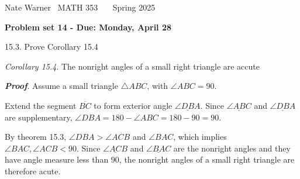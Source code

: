 \documentclass{report}
\title{\Huge{}}
\author{\huge{Nathan Warner}}
\date{\huge{}}
\begin{document}
    \pagebreak \bigbreak \noindent
    Nate Warner \ \quad \quad \quad \quad \quad \quad \quad \quad \quad \quad \quad \quad \quad \quad \quad \quad  MATH 353 \quad  \quad \quad \quad \quad \quad \quad \quad \quad \ \ \quad \quad \quad \quad \ \quad Spring 2025
    \begin{center}
        \textbf{Problem set 14 - Due: Monday, April 28}
    \end{center}
    \bigbreak \noindent 
    \begin{mdframed}
        15.3. Prove Corollary 15.4 
    \end{mdframed}
    \bigbreak \noindent 
    \begin{remark}
        \textit{Corollary 15.4}. The nonright angles of a small right triangle are accute
    \end{remark}
    \bigbreak \noindent 
    \textbf{\textit{Proof}}. Assume a small triangle $\triangle ABC$, with $\angle ABC = 90$.
    \bigbreak \noindent 
    \begin{figure}[ht]
        \centering
        \label{fig:smallright}
    \end{figure}
    \bigbreak \noindent 
    Extend the segment $\overline{BC}$ to form exterior angle $\underline{\angle DBA}$. Since $\underline{\angle ABC}$ and $\underline{\angle DBA}$ are supplementary, $\angle DBA  = 180 - \angle ABC = 180 - 90 = 90$.
    \bigbreak \noindent 
    \begin{figure}[ht]
        \centering
        \label{fig:fig2}
    \end{figure}
    \bigbreak \noindent 
    By theorem 15.3, $\angle DBA > \angle ACB$ and $ \angle BAC$, which implies $ \angle BAC, \angle ACB < 90$. Since $\underline{\angle ACB}$ and $ \underline{\angle BAC} $ are the nonright angles and they have angle measure less than $90$, the nonright angles of a small right triangle are therefore acute. \endpf
\end{document}
